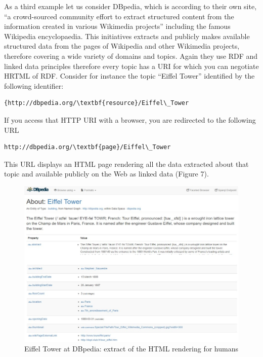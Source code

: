 As a third example let us consider DBpedia, which is according to their
own site, ``a crowd-sourced community effort to extract structured
content from the information created in various Wikimedia projects''
including the famous Wikipedia encyclopaedia. This initiatives extracts
and publicly makes available structured data from the pages of Wikipedia
and other Wikimedia projects, therefore covering a wide variety of
domains and topics. Again they use RDF and linked data principles
therefore every topic has a URI for which you can negotiate HRTML of
RDF. Consider for instance the topic ``Eiffel Tower'' identified by the
following identifier:

\begin{lstlisting}
{http://dbpedia.org/\textbf{resource}/Eiffel\_Tower
\end{lstlisting}

If you access that HTTP URI with a browser, you are redirected to the
following URL

\begin{lstlisting}
http://dbpedia.org/\textbf{page}/Eiffel\_Tower
\end{lstlisting}

This URL displays an HTML page rendering all the data extracted about
that topic and available publicly on the Web as linked data (Figure 7).

\begin{figure}
    \centering
    \includegraphics[width=5in]{media/figure-05-07.jpg}

    \caption{Eiffel Tower at DBpedia: extract of the HTML rendering for humans}
    \label{fig:ch5.7}
\end{figure}

